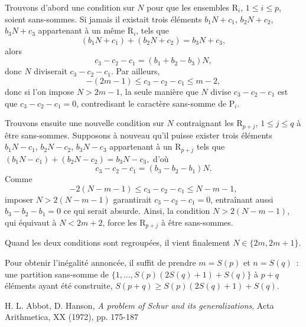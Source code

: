 \documentclass[11pt, oneside]{article}
\begin{document}
Trouvons d'abord une condition sur $N$ pour que les ensembles $\mathrm{R}_i$, $1 \leqslant i \leqslant p$, soient sans-sommes.
Si jamais il existait trois éléments $b_1 N + c_1$, $b_2 N + c_2$, $b_3 N + c_3$ appartenant à un même $\mathrm{R}_i$, tels que
\begin{equation}
 (b_1 N + c_1) + (b_2 N + c_2) = b_3 N + c_3,
\end{equation}
alors
\begin{equation}
 c_3 - c_2 - c_1 = (b_1 + b_2 - b_3)N,
\end{equation}
donc $N$ diviserait $c_3 - c_2 - c_1$. Par ailleurs,
\begin{equation}
 -(2m - 1) \leqslant c_3 - c_2 - c_1 \leqslant m-2,
\end{equation}
donc si l'on impose $N > 2m - 1$, la seule manière que $N$ divise $c_3 - c_2 - c_1$ est que $c_3 - c_2 - c_1 = 0$,
contredisant le caractère sans-somme de $\mathrm{P}_i$.

Trouvons ensuite une nouvelle condition sur $N$ contraignant les $\mathrm{R}_{p + j}$, $1 \leqslant j \leqslant q$ à être sans-sommes.
Supposons à nouveau qu'il puisse exister trois éléments $b_1 N - c_1$, $b_2 N - c_2$, $b_3 N - c_3$ appartenant à un $\mathrm{R}_{p + j}$
tels que $(b_1 N - c_1) + (b_2 N - c_2) = b_3 N - c_3,$ d'où
\begin{equation}
 c_3 - c_2 - c_1 = (b_3 - b_2 - b_1)N.
\end{equation}
Comme
\begin{equation}
 -2(N -m -1) \leqslant c_3 - c_2 - c_1 \leqslant N -m -1,
\end{equation}
imposer $N > 2(N -m -1)$ garantirait $c_3 - c_2 - c_1 = 0$,
entraînant aussi $b_3 - b_2 - b_1 = 0$ ce qui serait absurde.
Ainsi, la condition $N > 2(N -m -1)$, qui équivaut à $N < 2m + 2$, force les $\mathrm{R}_{p + j}$ à être sans-sommes.

Quand les deux conditions sont regroupées, il vient finalement $N \in \{2m, 2m+1\}$.

Pour obtenir l'inégalité annoncée, il suffit de prendre $m = S(p)$ et $n = S(q)$~:
une partition sans-somme de $\{1, \dots, S(p)(2S(q)+1) + S(q) \}$ à $p+q$ éléments ayant été construite, $S(p+q) \geqslant S(p)(2S(q)+1) + S(q)$.

\begin{thebibliography}{1}
  H. L. Abbot, D. Hanson, \textit{A problem of Schur and its generalizations}, Acta Arithmetica, XX (1972), pp. 175-187
\end{thebibliography}
\end{document}

